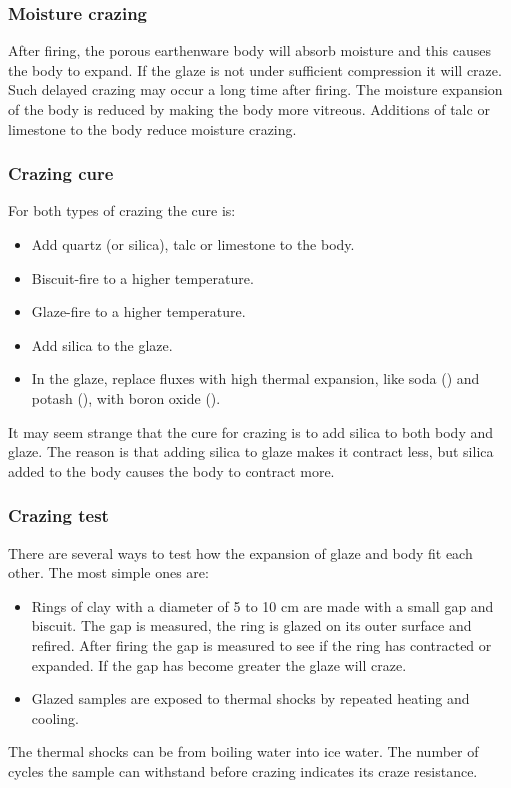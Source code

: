 \subsubsection{Moisture crazing}
After firing, the porous earthenware body will absorb moisture and this causes 
the body to expand. If the glaze is not under sufficient compression it will 
craze. Such delayed crazing may occur a long time after firing. The moisture 
expansion of the body is reduced by making the body more vitreous. Additions of 
talc or limestone to the body reduce moisture crazing.
\subsubsection{Crazing cure}
For both types of crazing the cure is:
\begin{itemize}
\item Add quartz (or silica), talc or limestone to the body.
\item Biscuit-fire to a higher temperature.
\item Glaze-fire to a higher temperature.
\item Add silica to the glaze.
\item In the glaze, replace fluxes with high thermal expansion, like soda 
() and potash (), with boron oxide ().
\end{itemize}
It may seem strange that the cure for crazing is to add silica to both body and 
glaze. The reason is that adding silica to glaze makes it contract less, but 
silica added to the body causes the body to contract more.
\subsubsection{Crazing test}
There are several ways to test how the expansion of glaze and body fit each 
other. The most simple ones are:
\begin{itemize}
\item Rings of clay with a diameter of 5 to 10 cm are made with a small gap and 
biscuit. The gap is measured, the ring is glazed on its outer surface and 
refired. After firing the gap is measured to see if the ring has contracted or 
expanded. If the gap has become greater the glaze will craze.
\item Glazed samples are exposed to thermal shocks by repeated heating and 
cooling.
\end{itemize}
The thermal shocks can be from boiling water into ice water. The number of 
cycles the sample can withstand before crazing indicates its craze resistance.


